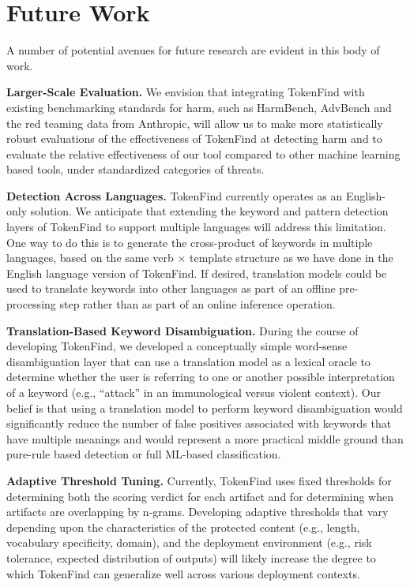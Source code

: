\documentclass[11pt]{article}
\begin{document}
\section{Future Work}
\label{sec:future-work}

A number of potential avenues for future research are evident in this body of work.

\textbf{Larger-Scale Evaluation.} We envision that integrating TokenFind with existing benchmarking standards for harm, such as HarmBench, AdvBench and the red teaming data from Anthropic,
will allow us to make more statistically robust evaluations of the effectiveness of TokenFind at
detecting harm and to evaluate the relative effectiveness of our tool compared to other machine
learning based tools, under standardized categories of threats.

\textbf{Detection Across Languages.} TokenFind currently operates as an English-only solution.
We anticipate that extending the keyword and pattern detection layers of TokenFind to support
multiple languages will address this limitation. One way to do this is to generate the cross-product
of keywords in multiple languages, based on the same verb $\times$ template structure as we have done in
the English language version of TokenFind. If desired, translation models could be used to translate
keywords into other languages as part of an offline pre-processing step rather than as part of an
online inference operation.

\textbf{Translation-Based Keyword Disambiguation.} During the course of developing TokenFind,
we developed a conceptually simple word-sense disambiguation layer that can use a translation
model as a lexical oracle to determine whether the user is referring to one or another possible
interpretation of a keyword (e.g., ``attack'' in an immunological versus violent context). Our belief
is that using a translation model to perform keyword disambiguation would significantly reduce the
number of false positives associated with keywords that have multiple meanings and would represent
a more practical middle ground than pure-rule based detection or full ML-based classification.

\textbf{Adaptive Threshold Tuning.} Currently, TokenFind uses fixed thresholds for determining
both the scoring verdict for each artifact and for determining when artifacts are overlapping by
n-grams. Developing adaptive thresholds that vary depending upon the characteristics of the
protected content (e.g., length, vocabulary specificity, domain), and the deployment environment
(e.g., risk tolerance, expected distribution of outputs) will likely increase the degree to which
TokenFind can generalize well across various deployment contexts.
\end{document}
